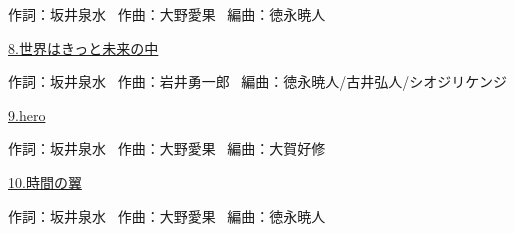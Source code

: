 \tiny{作詞：坂井泉水 \ 作曲：大野愛果 \ 編曲：徳永暁人}

\small{\hyperlink{9_7}{8.世界はきっと未来の中}}

\tiny{作詞：坂井泉水 \ 作曲：岩井勇一郎 \ 編曲：徳永暁人/古井弘人/シオジリケンジ}

\small{\hyperlink{9_8}{9.hero}}

\tiny{作詞：坂井泉水 \ 作曲：大野愛果 \ 編曲：大賀好修}

\small{\hyperlink{9_9}{10.時間の翼}}

\tiny{作詞：坂井泉水 \ 作曲：大野愛果 \ 編曲：徳永暁人}

\clearpage
